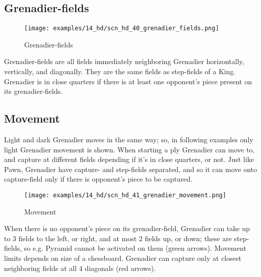 \vspace*{-0.3\baselineskip}
\subsection*{Grenadier-fields}
\label{sec:Hemera's Dawn/Grenadier/Grenadier-fields}

\vspace*{-0.7\baselineskip}
\noindent
\begin{wrapfigure}[9]{l}{0.4\textwidth}
\centering
\texttt{[image: examples/14\_hd/scn\_hd\_40\_grenadier\_fields.png]}
\vspace*{-0.5\baselineskip}
\caption{Grenadier-fields}
\label{fig:scn_hd_40_grenadier_fields}
\end{wrapfigure}
Grenadier-fields are all fields immediately neighboring Grenadier horizontally,
vertically, and diagonally. They are the same fields as step-fields of a King. \newline
\indent
Grenadier is in close quarters if there is at least one opponent's piece present
on its grenadier-fields.

\vspace*{-1.7\baselineskip}
\subsection*{Movement}
\label{sec:Hemera's Dawn/Grenadier/Movement}

\vspace*{-0.7\baselineskip}
Light and dark Grenadier moves in the same way; so, in following examples only
light Grenadier movement is shown. \newline
\indent
When starting a ply Grenadier can move to, and capture at different fields
depending if it's in close quarters, or not. \newline
\indent
Just like Pawn, Grenadier have capture- and step-fields separated, and so it
can move onto capture-field only if there is opponent's piece to be captured.

\clearpage %

\vspace*{-1.7\baselineskip}
\noindent
\begin{wrapfigure}[9]{l}{0.4\textwidth}
\centering
\texttt{[image: examples/14\_hd/scn\_hd\_41\_grenadier\_movement.png]}
\vspace*{-0.5\baselineskip}
\caption{Movement}
\label{fig:scn_hd_41_grenadier_movement}
\end{wrapfigure}
When there is no opponent's piece on its grenadier-field, Grenadier can take up
to 3 fields to the left, or right, and at most 2 fields up, or down; these are
step-fields, so e.g. Pyramid cannot be activated on them (green arrows). Movement
limits depends on size of a chessboard. \newline
\indent
Grenadier can capture only at closest neighboring fields at all 4 diagonals (red
arrows).

